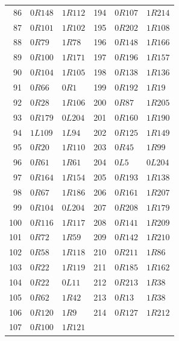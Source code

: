 \begin{longtable}{rll@{\qquad}rll}
86 & $0R148$ & $1R112$ & 194 & $0R107$ & $1R214$\\
87 & $0R101$ & $1R102$ & 195 & $0R202$ & $1R108$\\
88 & $0R79$ & $1R78$ & 196 & $0R148$ & $1R166$\\
89 & $0R100$ & $1R171$ & 197 & $0R196$ & $1R157$\\
90 & $0R104$ & $1R105$ & 198 & $0R138$ & $1R136$\\
91 & $0R66$ & $0R1$ & 199 & $0R192$ & $1R19$\\
92 & $0R28$ & $1R106$ & 200 & $0R87$ & $1R205$\\
93 & $0R179$ & $0L204$ & 201 & $0R160$ & $1R190$\\
94 & $1L109$ & $1L94$ & 202 & $0R125$ & $1R149$\\
95 & $0R20$ & $1R110$ & 203 & $0R45$ & $1R99$\\
96 & $0R61$ & $1R61$ & 204 & $0L5$ & $0L204$\\
97 & $0R164$ & $1R154$ & 205 & $0R193$ & $1R138$\\
98 & $0R67$ & $1R186$ & 206 & $0R161$ & $1R207$\\
99 & $0R104$ & $0L204$ & 207 & $0R208$ & $1R179$\\
100 & $0R116$ & $1R117$ & 208 & $0R141$ & $1R209$\\
101 & $0R72$ & $1R59$ & 209 & $0R142$ & $1R210$\\
102 & $0R58$ & $1R118$ & 210 & $0R211$ & $1R86$\\
103 & $0R22$ & $1R119$ & 211 & $0R185$ & $1R162$\\
104 & $0R22$ & $0L11$ & 212 & $0R213$ & $1R38$\\
105 & $0R62$ & $1R42$ & 213 & $0R13$ & $1R38$\\
106 & $0R120$ & $1R9$ & 214 & $0R127$ & $1R212$\\
107 & $0R100$ & $1R121$ & & &\\
\bottomrule
\end{longtable}
\renewcommand{\arraystretch}{1}\normalsize

